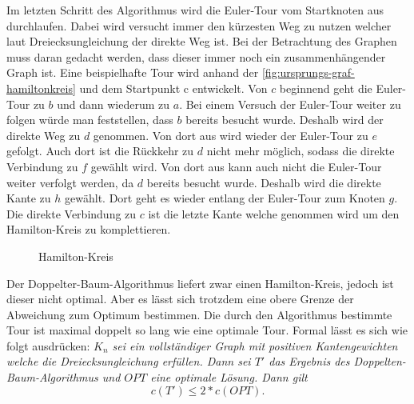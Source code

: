 \documentclass{article}
\begin{document}
Im letzten Schritt des Algorithmus wird die Euler-Tour vom Startknoten aus durchlaufen. Dabei wird versucht immer den kürzesten Weg zu nutzen welcher laut Dreiecksungleichung der direkte Weg ist. Bei der Betrachtung des Graphen muss daran gedacht werden, dass dieser immer noch ein zusammenhängender  Graph ist. Eine beispielhafte Tour wird anhand der \autoref{fig:ursprungs-graf-hamiltonkreis} und dem Startpunkt c entwickelt. Von $c$ beginnend geht die Euler-Tour zu $b$ und dann wiederum zu $a$. Bei einem Versuch der Euler-Tour weiter zu folgen würde man feststellen, dass $b$ bereits besucht wurde. Deshalb wird der direkte Weg zu $d$ genommen. Von dort aus wird wieder der Euler-Tour zu $e$ gefolgt. Auch dort ist die Rückkehr zu $d$ nicht mehr möglich, sodass die direkte Verbindung zu $f$ gewählt wird. Von dort aus kann auch nicht die Euler-Tour weiter verfolgt werden, da $d$ bereits besucht wurde. Deshalb wird die direkte Kante zu $h$ gewählt. Dort geht es wieder entlang der Euler-Tour zum Knoten $g$. Die direkte Verbindung zu $c$ ist die letzte Kante welche genommen wird um den Hamilton-Kreis zu komplettieren.

\begin{figure}[H]
\centering
{}
\caption{Hamilton-Kreis}
\label{fig:ursprungs-graf-hamiltonkreis}
\end{figure}

Der Doppelter-Baum-Algorithmus liefert zwar einen Hamilton-Kreis, jedoch ist dieser nicht optimal. Aber es lässt sich trotzdem eine obere Grenze der Abweichung zum Optimum bestimmen. Die durch den Algorithmus bestimmte Tour ist maximal doppelt so lang wie eine optimale Tour. Formal lässt es sich wie folgt ausdrücken:
\textit{$K_n$ sei ein vollständiger Graph mit positiven Kantengewichten welche die Dreiecksungleichung erfüllen. Dann sei $T'$ das Ergebnis des Doppelten-Baum-Algorithmus und $OPT$ eine optimale Lösung. Dann gilt
\begin{equation}
c(T') \leq 2 * c(OPT).
\label{eq:test}
\end{equation}}
\end{document}
